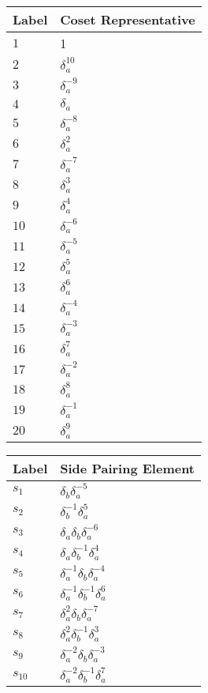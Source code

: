 \documentclass{article}
\begin{document}

\begin{center}
\begin{tabular}{ll}
\toprule
Label & Coset Representative\\
\midrule
$1$ & 1 \\
$2$ & $\delta_a^{10}$ \\
$3$ & $\delta_a^{-9}$ \\
$4$ & $\delta_a^{}$ \\
$5$ & $\delta_a^{-8}$ \\
$6$ & $\delta_a^{2}$ \\
$7$ & $\delta_a^{-7}$ \\
$8$ & $\delta_a^{3}$ \\
$9$ & $\delta_a^{4}$ \\
$10$ & $\delta_a^{-6}$ \\
$11$ & $\delta_a^{-5}$ \\
$12$ & $\delta_a^{5}$ \\
$13$ & $\delta_a^{6}$ \\
$14$ & $\delta_a^{-4}$ \\
$15$ & $\delta_a^{-3}$ \\
$16$ & $\delta_a^{7}$ \\
$17$ & $\delta_a^{-2}$ \\
$18$ & $\delta_a^{8}$ \\
$19$ & $\delta_a^{-1}$ \\
$20$ & $\delta_a^{9}$ \\
\bottomrule
\end{tabular}
\hfill
\begin{tabular}{ll}
\toprule
Label & Side Pairing Element\\
\midrule
$s_{1}$ & $\delta_b^{}\delta_a^{-5}$ \\
$s_{2}$ & $\delta_b^{-1}\delta_a^{5}$ \\
$s_{3}$ & $\delta_a^{}\delta_b^{}\delta_a^{-6}$ \\
$s_{4}$ & $\delta_a^{}\delta_b^{-1}\delta_a^{4}$ \\
$s_{5}$ & $\delta_a^{-1}\delta_b^{}\delta_a^{-4}$ \\
$s_{6}$ & $\delta_a^{-1}\delta_b^{-1}\delta_a^{6}$ \\
$s_{7}$ & $\delta_a^{2}\delta_b^{}\delta_a^{-7}$ \\
$s_{8}$ & $\delta_a^{2}\delta_b^{-1}\delta_a^{3}$ \\
$s_{9}$ & $\delta_a^{-2}\delta_b^{}\delta_a^{-3}$ \\
$s_{10}$ & $\delta_a^{-2}\delta_b^{-1}\delta_a^{7}$ \\

\end{tabular}
\end{center}
\end{document}
